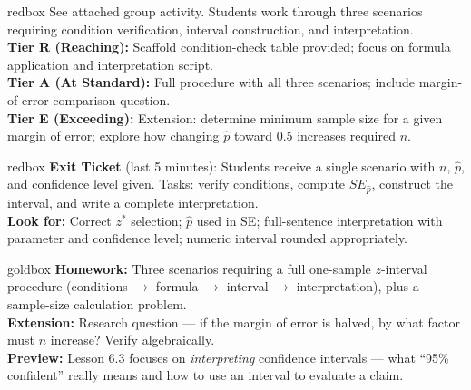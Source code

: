 \documentclass[10pt]{article}
\begin{document}
\begin{skillbox}{redbox}
    See attached group activity. Students work through three scenarios requiring condition
    verification, interval construction, and interpretation.\\[4pt]
    \textbf{Tier R (Reaching):} Scaffold condition-check table provided; focus on formula
    application and interpretation script. \\
    \textbf{Tier A (At Standard):} Full procedure with all three scenarios; include margin-of-error
    comparison question. \\
    \textbf{Tier E (Exceeding):} Extension: determine minimum sample size for a given margin of
    error; explore how changing $\hat p$ toward 0.5 increases required $n$.
\end{skillbox}

\begin{skillbox}{redbox}
    \textbf{Exit Ticket} (last 5 minutes): Students receive a single scenario with $n$, $\hat p$,
    and confidence level given. Tasks: verify conditions, compute $SE_{\hat p}$, construct the
    interval, and write a complete interpretation. \\[4pt]
    \textbf{Look for:} Correct $z^*$ selection; $\hat p$ used in SE; full-sentence interpretation
    with parameter and confidence level; numeric interval rounded appropriately.
\end{skillbox}

\begin{skillbox}{goldbox}
    \textbf{Homework:} Three scenarios requiring a full one-sample $z$-interval procedure (conditions
    $\to$ formula $\to$ interval $\to$ interpretation), plus a sample-size calculation problem.\\[4pt]
    \textbf{Extension:} Research question --- if the margin of error is halved, by what factor must
    $n$ increase? Verify algebraically. \\[4pt]
    \textbf{Preview:} Lesson 6.3 focuses on \emph{interpreting} confidence intervals --- what
    ``95\% confident'' really means and how to use an interval to evaluate a claim.
\end{skillbox}
\end{document}
